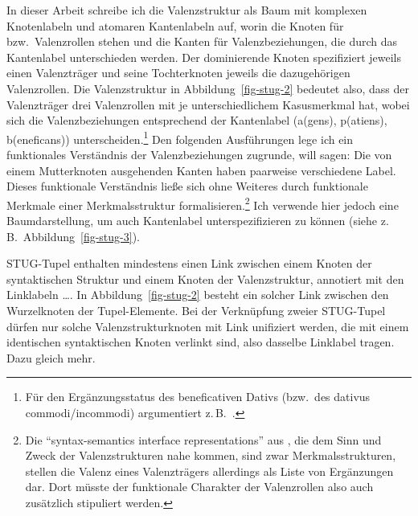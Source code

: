 In dieser Arbeit schreibe ich die Valenzstruktur als Baum mit komplexen Knotenlabeln und atomaren Kantenlabeln auf, worin die Knoten für  bzw.\ Valenzrollen stehen und die Kanten für Valenzbeziehungen, die durch das Kantenlabel unterschieden werden. Der dominierende Knoten spezifiziert jeweils einen Valenzträger und seine Tochterknoten jeweils die dazugehörigen Valenzrollen. Die Valenzstruktur in Abbildung~\ref{fig-stug-2} bedeutet also, dass der Valenzträger drei Valenzrollen mit je unterschiedlichem Kasusmerkmal hat, wobei sich die Valenzbeziehungen entsprechend der Kantenlabel ({\sc a(gens), p(atiens), b(eneficans)}) unterscheiden.\footnote{Für den Ergänzungsstatus des beneficativen Dativs (bzw.\ des dativus commodi/incommodi) argumentiert z.\,B.\ \citet[115]{Wegener:85}.} Den folgenden Ausführungen lege ich ein funktionales Verständnis der Valenzbeziehungen zugrunde, will sagen: Die von einem Mutterknoten ausgehenden Kanten haben paarweise verschiedene Label. Dieses funktionale Verständnis lie\ss e sich ohne Weiteres durch funktionale Merkmale einer Merkmalsstruktur formalisieren.\footnote{Die "`syntax-semantics interface representations"' aus \cite{Hahn:Meurers:11}, die dem Sinn und Zweck der Valenzstrukturen nahe kommen, sind zwar Merkmalsstrukturen, stellen die Valenz eines Valenzträgers allerdings als Liste von Ergänzungen dar. Dort müsste der funktionale Charakter der Valenzrollen also auch zusätzlich stipuliert werden.} Ich verwende hier jedoch eine Baumdarstellung, um auch Kantenlabel unterspezifizieren zu können (siehe z.\,B.\ Abbildung~\ref{fig-stug-3}).

STUG-Tupel enthalten mindestens einen Link zwischen einem Knoten der syntaktischen Struktur und einem Knoten der Valenzstruktur, annotiert mit den Linklabeln  \ldots {}. In Abbildung~\ref{fig-stug-2} besteht ein solcher Link zwischen den Wurzelknoten der Tupel-Elemente. Bei der Verknüpfung zweier STUG-Tupel dürfen nur solche Valenzstrukturknoten mit Link unifiziert werden, die mit einem identischen syntaktischen Knoten verlinkt sind, also dasselbe Linklabel tragen. Dazu gleich mehr. 

